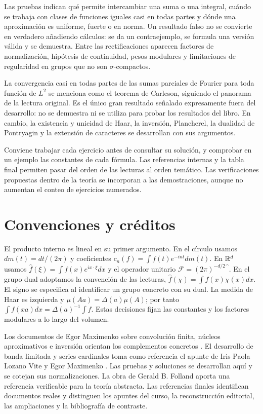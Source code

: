 Las pruebas indican qué permite intercambiar una suma o una integral, cuándo se trabaja con clases de funciones iguales casi en todas partes y dónde una aproximación es uniforme, fuerte o en norma. Un resultado falso no se convierte en verdadero añadiendo cálculos: se da un contraejemplo, se formula una versión válida y se demuestra. Entre las rectificaciones aparecen factores de normalización, hipótesis de continuidad, pesos modulares y limitaciones de regularidad en grupos que no son $\sigma$-compactos.

La convergencia casi en todas partes de las sumas parciales de Fourier para toda función de $L^2$ se menciona como el teorema de Carleson, siguiendo el panorama de la lectura original. Es el único gran resultado señalado expresamente fuera del desarrollo: no se demuestra ni se utiliza para probar los resultados del libro. En cambio, la existencia y unicidad de Haar, la inversión, Plancherel, la dualidad de Pontryagin y la extensión de caracteres se desarrollan con sus argumentos.

Conviene trabajar cada ejercicio antes de consultar su solución, y comprobar en un ejemplo las constantes de cada fórmula. Las referencias internas y la tabla final permiten pasar del orden de las lecturas al orden temático. Las verificaciones propuestas dentro de la teoría se incorporan a las demostraciones, aunque no aumentan el conteo de ejercicios numerados.

\section*{Convenciones y créditos}
El producto interno es lineal en su primer argumento. En el círculo usamos $dm(t)=dt/(2\pi)$ y coeficientes $c_n(f)=\int f(t)e^{-int}dm(t)$. En $\mathbb R^d$ usamos $\widehat f(\xi)=\int f(x)e^{ix\cdot\xi}dx$ y el operador unitario $\mathcal F=(2\pi)^{-d/2}\widehat{\phantom f}$. En el grupo dual adoptamos la convención de las lecturas, $\widehat f(\chi)=\int f(x)\chi(x)dx$. El signo se especifica al identificar un grupo concreto con su dual. La medida de Haar es izquierda y $\mu(Aa)=\Delta(a)\mu(A)$; por tanto $\int f(xa)dx=\Delta(a)^{-1}\int f$. Estas decisiones fijan las constantes y los factores modulares a lo largo del volumen.

Los documentos de Egor Maximenko sobre convolución finita, núcleos aproximativos e inversión orientan los complementos concretos \cite{maximenkoConvolucionFinita,maximenkoPeriodicos,maximenkoInversion}. El desarrollo de banda limitada y series cardinales toma como referencia el apunte de Iris Paola Lozano Vite y Egor Maximenko \cite{lozanoMaximenkoPaleyWiener}. Las pruebas y soluciones se desarrollan aquí y se cotejan sus normalizaciones. La obra de Gerald B. Folland \cite{folland2016} aporta una referencia verificable para la teoría abstracta. Las referencias finales identifican documentos reales y distinguen los apuntes del curso, la reconstrucción editorial, las ampliaciones y la bibliografía de contraste.

